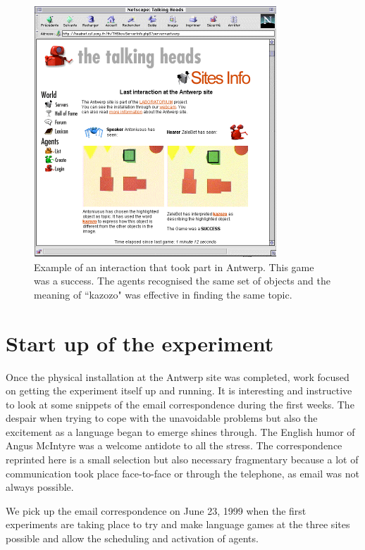 \begin{figure}[htbp]
  \centerline{\includegraphics[width=.85\textwidth]{chap8/figures/zelebot}}
\caption{\footnotesize\label{fig:thwebsite-agent} 
Example of an interaction that took part in Antwerp. This game was a success. The agents recognised the same
set of objects and the meaning of ``kazozo" was effective in finding the same topic. 
}
\end{figure}

\section{Start up of the experiment} 

Once the physical installation at the Antwerp site was completed, work focused on getting the experiment itself 
up and running. It is interesting and instructive to look at some snippets of the email correspondence during the 
first weeks. The despair when trying to cope with the unavoidable problems but also the excitement 
as a language began to emerge shines through. The English humor of Angus McIntyre was a welcome antidote to 
all the stress. The correspondence reprinted here is a small selection but also necessary fragmentary because a 
lot of communication took place face-to-face or through the telephone, as email was not always possible. 

We pick up the email correspondence on
June 23, 1999 when the first experiments are taking place to try and make language games at the three sites possible 
and allow the scheduling and activation of agents. 

